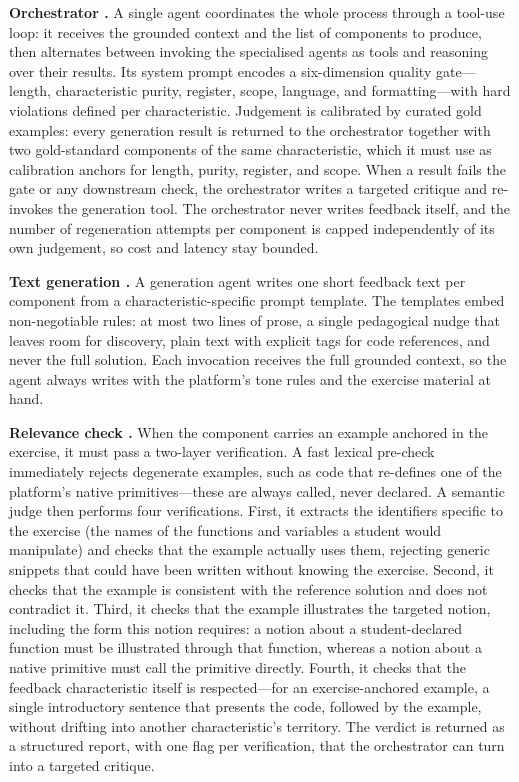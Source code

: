 \documentclass[10pt]{article}
\newcommand{\cmp}[1]{\raisebox{0.5pt}{\textcircled{\raisebox{-0.9pt}{\scriptsize #1}}}}
\begin{document}
\textbf{Orchestrator \cmp{3}.} A single agent coordinates the whole process through a tool-use loop: it receives the grounded context and the list of components to produce, then alternates between invoking the specialised agents as tools and reasoning over their results. Its system prompt encodes a six-dimension quality gate---length, characteristic purity, register, scope, language, and formatting---with hard violations defined per characteristic. Judgement is calibrated by curated gold examples: every generation result is returned to the orchestrator together with two gold-standard components of the same characteristic, which it must use as calibration anchors for length, purity, register, and scope. When a result fails the gate or any downstream check, the orchestrator writes a targeted critique and re-invokes the generation tool. The orchestrator never writes feedback itself, and the number of regeneration attempts per component is capped independently of its own judgement, so cost and latency stay bounded.

\textbf{Text generation \cmp{4}.} A generation agent writes one short feedback text per component from a characteristic-specific prompt template. The templates embed non-negotiable rules: at most two lines of prose, a single pedagogical nudge that leaves room for discovery, plain text with explicit tags for code references, and never the full solution. Each invocation receives the full grounded context, so the agent always writes with the platform's tone rules and the exercise material at hand.

\textbf{Relevance check \cmp{5}.} When the component carries an example anchored in the exercise, it must pass a two-layer verification. A fast lexical pre-check immediately rejects degenerate examples, such as code that re-defines one of the platform's native primitives---these are always called, never declared. A semantic judge then performs four verifications. First, it extracts the identifiers specific to the exercise (the names of the functions and variables a student would manipulate) and checks that the example actually uses them, rejecting generic snippets that could have been written without knowing the exercise. Second, it checks that the example is consistent with the reference solution and does not contradict it. Third, it checks that the example illustrates the targeted notion, including the form this notion requires: a notion about a student-declared function must be illustrated through that function, whereas a notion about a native primitive must call the primitive directly. Fourth, it checks that the feedback characteristic itself is respected---for an exercise-anchored example, a single introductory sentence that presents the code, followed by the example, without drifting into another characteristic's territory. The verdict is returned as a structured report, with one flag per verification, that the orchestrator can turn into a targeted critique.
\end{document}
